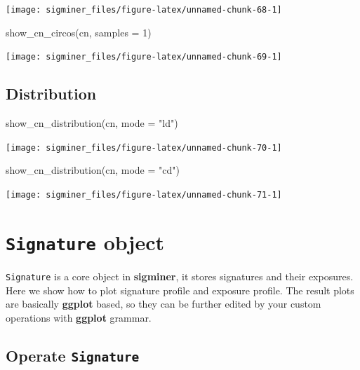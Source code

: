 \documentclass[
  12pt,
  a4paper,
  twoside]{book}
\newenvironment{Shaded}{\begin{snugshade}}{\end{snugshade}}
\newcommand{\AttributeTok}[1]{\textcolor[rgb]{0.77,0.63,0.00}{#1}}
\newcommand{\DecValTok}[1]{\textcolor[rgb]{0.00,0.00,0.81}{#1}}
\newcommand{\FunctionTok}[1]{\textcolor[rgb]{0.00,0.00,0.00}{#1}}
\newcommand{\NormalTok}[1]{#1}
\newcommand{\StringTok}[1]{\textcolor[rgb]{0.31,0.60,0.02}{#1}}
\begin{document}
\texttt{[image: sigminer\_files/figure-latex/unnamed-chunk-68-1]}

\begin{Shaded}
\begin{Highlighting}[]
\FunctionTok{show\_cn\_circos}\NormalTok{(cn, }\AttributeTok{samples =} \DecValTok{1}\NormalTok{)}
\end{Highlighting}
\end{Shaded}

\texttt{[image: sigminer\_files/figure-latex/unnamed-chunk-69-1]}

\hypertarget{distribution}{%
\subsection{Distribution}\label{distribution}}

\begin{Shaded}
\begin{Highlighting}[]
\FunctionTok{show\_cn\_distribution}\NormalTok{(cn, }\AttributeTok{mode =} \StringTok{"ld"}\NormalTok{)}
\end{Highlighting}
\end{Shaded}

\texttt{[image: sigminer\_files/figure-latex/unnamed-chunk-70-1]}

\begin{Shaded}
\begin{Highlighting}[]
\FunctionTok{show\_cn\_distribution}\NormalTok{(cn, }\AttributeTok{mode =} \StringTok{"cd"}\NormalTok{)}
\end{Highlighting}
\end{Shaded}

\texttt{[image: sigminer\_files/figure-latex/unnamed-chunk-71-1]}

\hypertarget{signature-object}{%
\section{\texorpdfstring{\texttt{Signature} object}{Signature object}}\label{signature-object}}

\texttt{Signature} is a core object in \textbf{sigminer}, it stores signatures and their exposures. Here we show how to plot signature profile and exposure profile. The result plots are basically \textbf{ggplot} based, so they can be further edited by your custom operations with \textbf{ggplot} grammar.

\hypertarget{operate-signature}{%
\subsection{\texorpdfstring{Operate \texttt{Signature}}{Operate Signature}}\label{operate-signature}}
\end{document}
